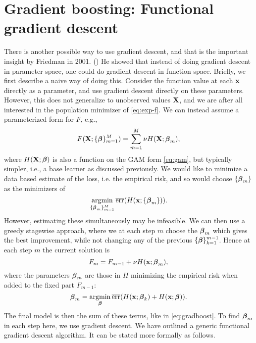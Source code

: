 \section{Gradient boosting: Functional gradient descent}
There is another possible way to use gradient descent, and that is the important insight by Friedman in 2001. (\cite{friedman2001}) He showed that instead of doing gradient descent in parameter space, one could do gradient descent in function space. Briefly, we first describe a naive way of doing this. Consider the function value at each $\mathbf{x}$ directly as a parameter, and use gradient descent directly on these parameters. However, this does not generalize to unobserved values $\mathbf{X}$, and we are after all interested in the population minimizer of \eqref{eq:exp-f}. We can instead assume a parameterized form for $F$, e.g.,
\begin{equation}\label{eq:gradboost}
    F(\mathbf{X};\{\boldsymbol{\beta}\}_{m=1}^M)=\sum_{m=1}^M\nu H(\mathbf{X};\boldsymbol{\beta}_m),
\end{equation}
where $H(\mathbf{X};\boldsymbol{\beta})$ is also a function on the GAM form \eqref{eq:gam}, but typically simpler, i.e., a base learner as discussed previously. We would like to minimize a data based estimate of the loss, i.e. the empirical risk, and so would choose $\{\boldsymbol{\beta}_m\}$ as the minimizers of 
\begin{equation}
    \operatorname*{argmin}_{\{\boldsymbol{\beta}_m\}_{m=1}^M}\overline{\text{err}}(H(\mathbf{x};\{\boldsymbol{\beta}_m\})).
\end{equation}
However, estimating these simultaneously may be infeasible. We can then use a greedy stagewise approach, where we at each step $m$ choose the $\boldsymbol{\beta}_m$ which gives the best improvement, while not changing any of the previous $\{\boldsymbol{\beta}\}_{k=1}^{m-1}$. Hence at each step $m$ the current solution is
\begin{equation}
    F_{m}=F_{m-1}+\nu H(\mathbf{x};\boldsymbol{\beta}_m),
\end{equation}
where the parameters $\boldsymbol{\beta}_m$ are those in $H$ minimizing the empirical risk when added to the fixed part $F_{m-1}$:
\begin{equation}
    \boldsymbol{\beta}_m=\operatorname*{argmin}_{\boldsymbol{\beta}}\overline{\text{err}}(H(\mathbf{x};\boldsymbol{\beta}_k)+H(\mathbf{x};\boldsymbol{\beta})).
\end{equation}
The final model is then the sum of these terms, like in \eqref{eq:gradboost}. To find $\boldsymbol{\beta}_m$ in each step here, we use gradient descent. We have outlined a generic functional gradient descent algorithm. It can be stated more formally as follows.
